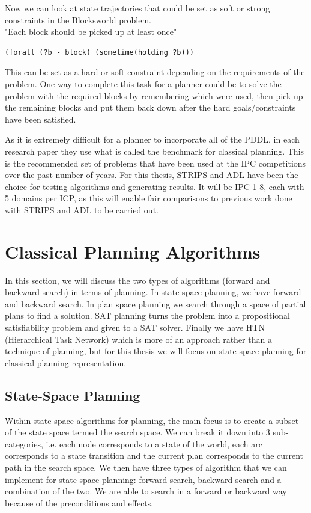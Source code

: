 Now we can look at state trajectories that could be set as soft or strong constraints in the Blocksworld problem.
\\
"Each block should be picked up at least once" 
\begin{verbatim}
(forall (?b - block) (sometime(holding ?b)))
\end{verbatim}\cite{PDDL3} 
This can be set as a hard or soft constraint depending on the requirements of the problem. One way to complete this task for a planner could be to solve the problem with the required blocks by remembering which were used, then pick up the remaining blocks and put them back down after the hard goals/constraints have been satisfied. 

As it is extremely difficult for a planner to incorporate all of the PDDL, in each research paper they use what is called the benchmark for classical planning. This is the recommended set of problems that have been used at the IPC competitions over the past number of years\cite{ICAPS}. For this thesis, STRIPS and ADL have been the choice for testing algorithms and generating results. It will be IPC 1-8, each with 5 domains per ICP, as this will enable fair comparisons to previous work done with STRIPS and ADL to be carried out. 
\section{Classical Planning Algorithms}

In this section, we will discuss the two types of algorithms (forward and backward search) in terms of planning. In state-space planning, we have forward and backward search. In plan space planning we search through a space of partial plans to find a solution. SAT planning turns the problem into a propositional satisfiability problem and given to a SAT solver. Finally we have HTN (Hierarchical Task Network) which is more of an approach rather than a technique of planning, but for this thesis we will focus on state-space planning for classical planning representation. 
\subsection{State-Space Planning}

Within state-space algorithms for planning, the main focus is to create a subset of the state space termed the search space. We can break it down into 3 sub-categories, i.e. each node corresponds to a state of the world, each arc corresponds to a state transition and the current plan corresponds to the current path in the search space\cite{PlanningBook}. We then have three types of algorithm that we can implement for state-space planning: forward search, backward search and a combination of the two. We are able to search in a forward or backward way because of the preconditions and effects. 
